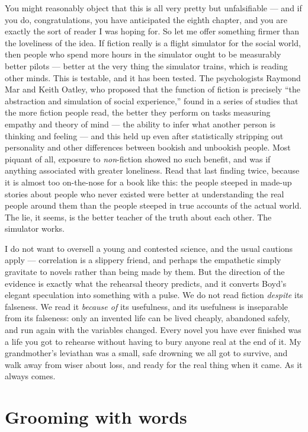 You might reasonably object that this is all very pretty but unfalsifiable — and if you do, congratulations, you have anticipated the eighth chapter, and you are exactly the sort of reader I was hoping for. So let me offer something firmer than the loveliness of the idea. If fiction really is a flight simulator for the social world, then people who spend more hours in the simulator ought to be measurably better pilots — better at the very thing the simulator trains, which is reading other minds. This is testable, and it has been tested. The psychologists Raymond Mar and Keith Oatley, who proposed that the function of fiction is precisely ``the abstraction and simulation of social experience,'' found in a series of studies that the more fiction people read, the better they perform on tasks measuring empathy and theory of mind — the ability to infer what another person is thinking and feeling — and this held up even after statistically stripping out personality and other differences between bookish and unbookish people. Most piquant of all, exposure to \emph{non}-fiction showed no such benefit, and was if anything associated with greater loneliness. Read that last finding twice, because it is almost too on-the-nose for a book like this: the people steeped in made-up stories about people who never existed were better at understanding the real people around them than the people steeped in true accounts of the actual world. The lie, it seems, is the better teacher of the truth about each other. The simulator works.

I do not want to oversell a young and contested science, and the usual cautions apply — correlation is a slippery friend, and perhaps the empathetic simply gravitate to novels rather than being made by them. But the direction of the evidence is exactly what the rehearsal theory predicts, and it converts Boyd's elegant speculation into something with a pulse. We do not read fiction \emph{despite} its falseness. We read it \emph{because of} its usefulness, and its usefulness is inseparable from its falseness: only an invented life can be lived cheaply, abandoned safely, and run again with the variables changed. Every novel you have ever finished was a life you got to rehearse without having to bury anyone real at the end of it. My grandmother's leviathan was a small, safe drowning we all got to survive, and walk away from wiser about loss, and ready for the real thing when it came. As it always comes.

\section*{Grooming with words}

